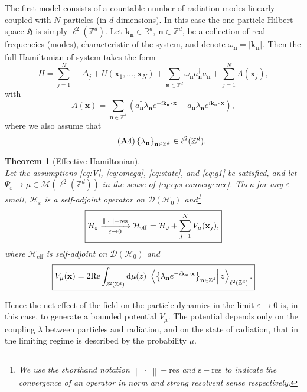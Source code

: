 \documentclass[11pt,a4paper,reqno]{amsart}
\renewcommand{\Re}{\mathrm{Re}}
\newtheorem{thm}{Theorem}[section]
\theoremstyle{definition}
\numberwithin{equation}{section}
\newcommand{\beq}{\begin{equation}}
\newcommand{\eeq}{\end{equation}}
\newcommand{\disp}{\displaystyle}
\newcommand{\lf}{\left}
\newcommand{\ri}{\right}
\newcommand{\braketl}[2]{\lf.\lf\langle #1\ri|#2 \ri\rangle}
\newcommand{\xv}{\mathbf{x}}
\newcommand{\kv}{\mathbf{k}}
\newcommand{\nv}{\mathbf{n}}
\newcommand{\eps}{\varepsilon}
\newcommand{\Z}{\mathbb{Z}}
\newcommand{\R}{\mathbb{R}}
\newcommand{\M}{\mathscr{M}}
\newcommand{\dom}{\mathscr{D}}
\newcommand{\HH}{\mathcal{H}}
\newcommand{\HHe}{\mathcal{H}_{\mathrm{eff}}}
\newcommand{\hh}{\mathfrak{H}}
\begin{document}
The first model consists of a countable number of radiation modes linearly coupled with $ N $ particles (in
$d$ dimensions). In this case the one-particle Hilbert space $ \hh $ is simply $ \ell^2(\Z^d) $. Let
$ \kv_{\nv} \in \R^d $, $ \nv \in \Z^d $, be a collection of real frequencies (modes), characteristic of the
system, and denote $\omega_{\nv}=\lvert \kv_{\nv} \rvert_{}^{}$. Then the full Hamiltonian of system takes the form
\begin{equation}
 	\label{eq:H1}
	H=\disp\sum_{j=1}^N -\Delta_j +U(\xv_1,\ldots,\xv_N)+ \sum_{\nv \in \Z^d} \omega_{\nv} a^{\dagger}_{\nv} a_{\nv} + \sum_{j=1}^N A(\xv_j),
\end{equation}
with
\begin{equation}
 	\label{eq:A1}
 	A(\xv)= \disp\sum_{\nv \in \Z^d} \lf( a^{\dagger}_{\nv} \lambda_{\nv} e^{-i \kv_{\nv} \cdot \xv} + a_{\nv} \lambda_{\nv} e^{i \kv_{\nv} \cdot \xv} \ri),
\end{equation}
where we also assume that
\beq
	\label{eq:g1}\tag{{\bf A}4}
	\lf\{ \lambda_{\nv} \ri\}_{\nv \in \Z^d} \in \ell^2(\Z^d).
\eeq


	\begin{thm}[Effective Hamiltonian]
  		\label{teo:conv1}
  		\mbox{}	\\
		Let the assumptions \eqref{eq:V}, \eqref{eq:omega}, \eqref{eq:state}, and \eqref{eq:g1} be satisfied, and let $ \Psi_{\eps}\to  \mu \in \M(\ell^2(\Z^d)) $ in the sense of \eqref{eq:eps convergence}. Then for any $ \eps $ small, $ \HH_{\eps} $ is a self-adjoint operator on $ \dom(\HH_0) $ and\footnote{We use the shorthand notation $ \lf\| \: \cdot \: \ri\|-\mathrm{res} $ and $ \mathrm{s}-\mathrm{res} $ to indicate the convergence of an operator in norm and strong resolvent sense respectively.}
		\beq
			\label{eq:conv1}
			\framebox{$ \HH_{\eps} \xrightarrow[\eps \to 0]{\lf\| \: \cdot \: \ri\|-\mathrm{res}} \HHe = \HH_0 + \disp\sum_{j = 1}^N V_{\mu}(\xv_j)$,}
		\eeq
		where $ \HHe $ is self-adjoint on $ \dom(\HH_0) $ and
		 \begin{equation}
		 	\label{eq:V1}
 	  	 	\framebox{$ V_{\mu}(\xv) = 2\Re\disp\int_{\ell^2(\mathbb{Z}^d)}^{}\mathrm{d}\mu(z) \: \braketl{\lf\{ \lambda_{\nv} e^{-i \kv_{\nv} \cdot \xv} \ri\}_{\nv \in \Z^d}}{z}_{\ell^2(\Z^d)}. $}
                      \end{equation}
	\end{thm}
	

Hence the net effect of the field on the particle dynamics in the limit $ \eps \to 0 $ is, in this case, to generate a bounded potential $ V_{\mu} $. The potential depends only on the coupling $\lambda$ between particles and radiation, and on the state of radiation, that in the limiting regime is described by the probability $\mu$. 
\end{document}
